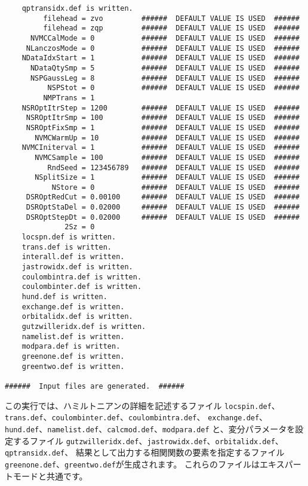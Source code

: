 \begin{verbatim}
    qptransidx.def is written.
         filehead = zvo         ######  DEFAULT VALUE IS USED  ######
         filehead = zqp         ######  DEFAULT VALUE IS USED  ######
      NVMCCalMode = 0           ######  DEFAULT VALUE IS USED  ######
     NLanczosMode = 0           ######  DEFAULT VALUE IS USED  ######
    NDataIdxStart = 1           ######  DEFAULT VALUE IS USED  ######
      NDataQtySmp = 5           ######  DEFAULT VALUE IS USED  ######
      NSPGaussLeg = 8           ######  DEFAULT VALUE IS USED  ######
          NSPStot = 0           ######  DEFAULT VALUE IS USED  ######
         NMPTrans = 1
    NSROptItrStep = 1200        ######  DEFAULT VALUE IS USED  ######
     NSROptItrSmp = 100         ######  DEFAULT VALUE IS USED  ######
     NSROptFixSmp = 1           ######  DEFAULT VALUE IS USED  ######
       NVMCWarmUp = 10          ######  DEFAULT VALUE IS USED  ######
    NVMCIniterval = 1           ######  DEFAULT VALUE IS USED  ######
       NVMCSample = 100         ######  DEFAULT VALUE IS USED  ######
          RndSeed = 123456789   ######  DEFAULT VALUE IS USED  ######
       NSplitSize = 1           ######  DEFAULT VALUE IS USED  ######
           NStore = 0           ######  DEFAULT VALUE IS USED  ######
     DSROptRedCut = 0.00100     ######  DEFAULT VALUE IS USED  ######
     DSROptStaDel = 0.02000     ######  DEFAULT VALUE IS USED  ######
     DSROptStepDt = 0.02000     ######  DEFAULT VALUE IS USED  ######
              2Sz = 0
    locspn.def is written.
    trans.def is written.
    interall.def is written.
    jastrowidx.def is written.
    coulombintra.def is written.
    coulombinter.def is written.
    hund.def is written.
    exchange.def is written.
    orbitalidx.def is written.
    gutzwilleridx.def is written.
    namelist.def is written.
    modpara.def is written.
    greenone.def is written.
    greentwo.def is written.

######  Input files are generated.  ######
\end{verbatim}
\normalsize

この実行では、ハミルトニアンの詳細を記述するファイル
\verb|locspin.def|、\verb|trans.def|、\verb|coulombinter.def|、\verb|coulombintra.def|、
\verb|exchange.def|、\verb|hund.def|、\verb|namelist.def|、\verb|calcmod.def|、\verb|modpara.def|
と、変分パラメータを設定するファイル
\verb|gutzwilleridx.def|、\verb|jastrowidx.def|、\verb|orbitalidx.def|、\verb|qptransidx.def|、
結果として出力する相関関数の要素を指定するファイル
\verb|greenone.def|、\verb|greentwo.def|が生成されます。
これらのファイルはエキスパートモードと共通です。

